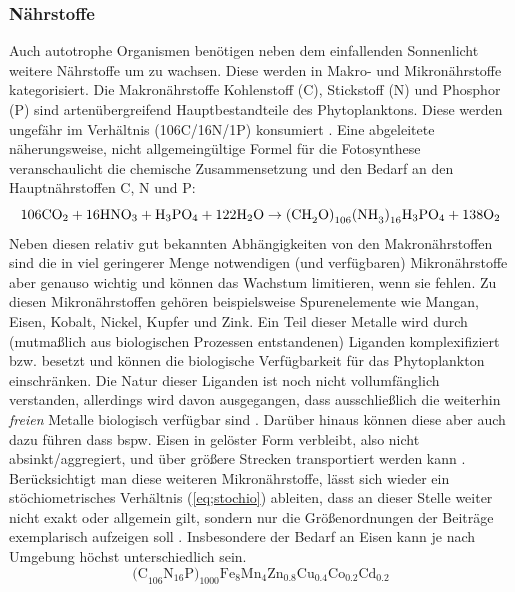 \documentclass[12pt,a4paper,onecolumn]{scrartcl}
\newcommand{\cotwo}{CO\textsubscript{2}}
\begin{document}
\subsubsection{Nährstoffe} \label{sec:nährstoffe}
Auch autotrophe Organismen benötigen neben dem einfallenden Sonnenlicht weitere Nährstoffe um zu wachsen. Diese werden in Makro- und Mikronährstoffe kategorisiert. Die Makronährstoffe Kohlenstoff (C), Stickstoff (N) und Phosphor (P) sind artenübergreifend  Hauptbestandteile des Phytoplanktons. Diese werden ungefähr im Verhältnis (106C/16N/1P) konsumiert \citep{Falkowski.1998}. Eine abgeleitete näherungsweise, nicht allgemeingültige Formel für die Fotosynthese  \citep{Emerson.2009} veranschaulicht die chemische Zusammensetzung und den Bedarf an den Hauptnährstoffen C, N und P:
\begin{equation}
\text{106\cotwo} + \text{16HNO}_3 + \text{H}_3\text{PO}_4 + \text{122H}_2\text{O} \rightarrow \text{(CH}_2\text{O)}_{106}\text{(NH}_3\text{)}_{16}\text{H}_3\text{PO}_4 + \text{138O}_2
\end{equation}
Neben diesen relativ gut bekannten Abhängigkeiten von den Makronährstoffen sind die in viel geringerer Menge notwendigen (und verfügbaren) Mikronährstoffe aber genauso wichtig und können das Wachstum limitieren, wenn sie fehlen. Zu diesen Mikronährstoffen gehören beispielsweise Spurenelemente wie Mangan, Eisen, Kobalt, Nickel, Kupfer und Zink. Ein Teil dieser Metalle wird durch (mutmaßlich aus biologischen Prozessen entstandenen) Liganden komplexifiziert bzw. besetzt und können die biologische Verfügbarkeit für das Phytoplankton einschränken. Die Natur dieser Liganden ist noch nicht vollumfänglich verstanden, allerdings wird davon ausgegangen, dass ausschließlich die weiterhin \textit{freien} Metalle biologisch verfügbar sind \citep{Emerson.2009}. Darüber hinaus können diese aber auch dazu führen dass bspw. Eisen in gelöster Form verbleibt, also nicht absinkt/aggregiert, und über größere Strecken transportiert werden kann \citep{Tagliabue.2017}. Berücksichtigt man diese weiteren Mikronährstoffe, lässt sich wieder ein stöchiometrisches Verhältnis (\ref{eq;stochio}) ableiten, dass an dieser Stelle weiter nicht exakt oder allgemein gilt, sondern nur die Größenordnungen der Beiträge exemplarisch aufzeigen soll \citep{Emerson.2009}. Insbesondere der Bedarf an Eisen kann je nach Umgebung höchst unterschiedlich sein.
\begin{equation}
\text{(C}_{106} \text{N}_{16} \text{P)}_{1000} \text{Fe}_8\text{Mn}_4\text{Zn}_{0.8}\text{Cu}_{0.4}\text{Co}_{0.2} \text{Cd}_{0.2} \label{eq;stochio}
\end{equation}
\end{document}
